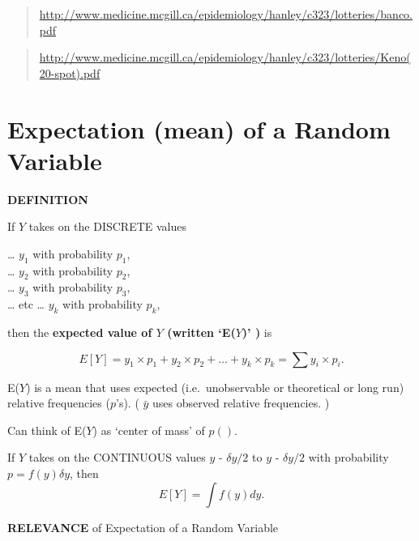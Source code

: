 \documentclass[]{book}
\begin{document}
\begin{quote}
\url{http://www.medicine.mcgill.ca/epidemiology/hanley/c323/lotteries/banco.pdf}
\end{quote}

\begin{quote}
\url{http://www.medicine.mcgill.ca/epidemiology/hanley/c323/lotteries/Keno(20-spot).pdf}
\end{quote}

\hypertarget{expectation-mean-of-a-random-variable}{%
\section{Expectation (mean) of a Random Variable}\label{expectation-mean-of-a-random-variable}}

\textbf{DEFINITION}

If \(Y\) takes on the DISCRETE values

\ldots{} \(y_1\) with probability \(p_1\),\\
\ldots{} \(y_2\) with probability \(p_2\),\\
\ldots{} \(y_3\) with probability \(p_3\),\\
\ldots{} etc
\ldots{} \(y_k\) with probability \(p_k\),

then the \textbf{expected value of \(Y\) (written `E(\(Y\))' )} is

\[E[Y] = y_1 \times p_1 + y_2 \times p_2 + \dots + y_k \times p_k = \sum y_i \times p_i.\]

E(\(Y\)) is a mean that uses expected (i.e.~unobservable or theoretical or long run) relative frequencies (\(p\)'s). ( \(\bar{y}\) uses observed relative frequencies. )

Can think of E(\(Y\)) as `center of mass' of \(p().\)

If \(Y\) takes on the CONTINUOUS values \(y\) - \(\delta y/2\) to \(y\) - \(\delta y/2\) with probability
\(p = f(y) \delta y\), then
\[ E[Y] = \int f(y) dy.\]

\textbf{RELEVANCE} of Expectation of a Random Variable
\end{document}
